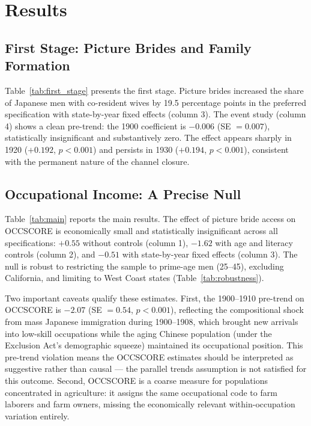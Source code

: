 \documentclass[12pt]{article}
\begin{document}
\section{Results}

\subsection{First Stage: Picture Brides and Family Formation}



Table~\ref{tab:first_stage} presents the first stage. Picture brides increased the share of Japanese men with co-resident wives by 19.5 percentage points in the preferred specification with state-by-year fixed effects (column 3). The event study (column 4) shows a clean pre-trend: the 1900 coefficient is $-0.006$ (SE $= 0.007$), statistically insignificant and substantively zero. The effect appears sharply in 1920 ($+0.192$, $p < 0.001$) and persists in 1930 ($+0.194$, $p < 0.001$), consistent with the permanent nature of the channel closure.

\subsection{Occupational Income: A Precise Null}



Table~\ref{tab:main} reports the main results. The effect of picture bride access on OCCSCORE is economically small and statistically insignificant across all specifications: $+0.55$ without controls (column 1), $-1.62$ with age and literacy controls (column 2), and $-0.51$ with state-by-year fixed effects (column 3). The null is robust to restricting the sample to prime-age men (25--45), excluding California, and limiting to West Coast states (Table~\ref{tab:robustness}).

Two important caveats qualify these estimates. First, the 1900--1910 pre-trend on OCCSCORE is $-2.07$ (SE $= 0.54$, $p < 0.001$), reflecting the compositional shock from mass Japanese immigration during 1900--1908, which brought new arrivals into low-skill occupations while the aging Chinese population (under the Exclusion Act's demographic squeeze) maintained its occupational position. This pre-trend violation means the OCCSCORE estimates should be interpreted as suggestive rather than causal --- the parallel trends assumption is not satisfied for this outcome. Second, OCCSCORE is a coarse measure for populations concentrated in agriculture: it assigns the same occupational code to farm laborers and farm owners, missing the economically relevant within-occupation variation entirely.
\end{document}
